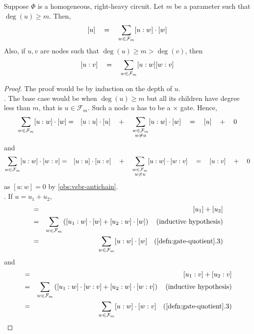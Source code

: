 \begin{lemma}\label{lem:vsbr-key-lemma}
Suppose $\Phi$ is a homogeneous, right-heavy circuit. 
Let $m$ be a parameter such that $\deg(u) \geq m$. 
Then,
\begin{equation}\label{eqn:vsbr-for-u}
[u]\quad = \quad \sum_{w\in \mathcal{F}_m} [u:w] \cdot [w]
\end{equation}
Also, if $u,v$ are nodes such that $\deg(u) \geq m > \deg(v)$, then
\begin{equation}\label{eqn:vsbr-for-uv}
[u:v] \quad = \quad \sum_{w\in \mathcal{F}_m} [u:w] [w:v]
\end{equation}
\end{lemma}
\begin{proof}
The proof would be by induction on the depth of $u$.\\

. 
The base case would be when $\deg(u) \geq m$ but all its children have degree less than $m$, that is $u \in \mathcal{F}_m$. 
Such a node $u$ has to be a $\times$ gate. 
Hence,
\begin{eqnarray*}
\sum_{w\in \mathcal{F}_m} [u:w] \cdot [w] &=& [u:u] \cdot [u] \quad + \quad\sum_{\substack{w\in \mathcal{F}_m\\w\neq u}} [u:w] \cdot [w] \quad = \quad [u] \quad + \quad 0\\
\end{eqnarray*}
and
\begin{eqnarray*}
\sum_{w\in \mathcal{F}_m} [u:w] \cdot [w:v] &=& [u:u] \cdot [u:v] \quad + \quad\sum_{\substack{w\in \mathcal{F}_m\\w\neq u}} [u:w] \cdot [w:v] \quad = \quad [u:v] \quad + \quad 0
\end{eqnarray*}
as $[u:w] = 0$ by \autoref{obs:vsbr-antichain}.\\

. 
If $u = u_1 + u_2$,
\begin{eqnarray*}
  [u] &=& [u_1] + [u_2] \\
  &=& \sum_{w\in \mathcal{F}_m} \inparen{[u_1: w]\cdot [w]  + [u_2:w]\cdot [w]}\quad\text{(inductive hypothesis)}\\
  &=& \sum_{w\in \mathcal{F}_m} [u:w] \cdot [w] \quad\text{(\autoref{defn:gate-quotient}.3)}
\end{eqnarray*}
and
\begin{eqnarray*}
  [u:v] &=& [u_1:v] + [u_2:v] \\
  &=& \sum_{w\in \mathcal{F}_m} \inparen{[u_1: w]\cdot [w:v]  + [u_2:w]\cdot [w:v]}\quad\text{(inductive hypothesis)}\\
  &=& \sum_{w\in \mathcal{F}_m} [u:w] \cdot [w:v] \quad\text{(\autoref{defn:gate-quotient}.3)}
\end{eqnarray*}



\end{proof}

